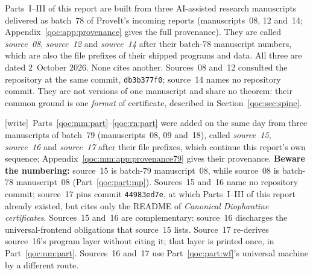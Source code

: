 \documentclass[11pt,letterpaper]{article}
\theoremstyle{definition}
\theoremstyle{remark}
\newcommand{\wtag}{\textup{[write]}}
\begin{document}
Parts~I--III of this report are built from three AI-assisted research manuscripts delivered as batch~78 of ProveIt's incoming reports (manuscripts~08, 12 and~14; Appendix~\ref{qoc:app:provenance} gives the full provenance). They are called \emph{source~08}, \emph{source~12} and \emph{source~14} after their batch-78 manuscript numbers, which are also the file prefixes of their shipped programs and data. All three are dated 2~October 2026. None cites another. Sources~08 and~12 consulted the repository at the same commit, \texttt{db3b377f0}; source~14 names no repository commit. They are not versions of one manuscript and share no theorem: their common ground is one \emph{format} of certificate, described in Section~\ref{qoc:sec:spine}.

\wtag\ Parts~\ref{qoc:mm:part}--\ref{qoc:rn:part} were added on the same day from three manuscripts of batch~79 (manuscripts~08, 09 and~18), called \emph{source~15}, \emph{source~16} and \emph{source~17} after their file prefixes, which continue this report's own sequence; Appendix~\ref{qoc:mm:app:provenance79} gives their provenance. \textbf{Beware the numbering:} source~15 is batch-79 manuscript~08, while source~08 is batch-78 manuscript~08 (Part~\ref{qoc:part:mp}). Sources~15 and~16 name no repository commit; source~17 pins commit \texttt{44983ed7e}, at which Parts~I--III of this report already existed, but cites only the README of \emph{Canonical Diophantine certificates}. Sources~15 and~16 are complementary: source~16 discharges the universal-frontend obligations that source~15 lists. Source~17 re-derives source~16's program layer without citing it; that layer is printed once, in Part~\ref{qoc:um:part}. Sources~16 and~17 use Part~\ref{qoc:part:wf}'s universal machine by a different route.
\end{document}
